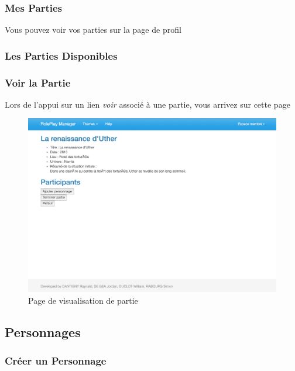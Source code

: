 \documentclass[a4paper,oneside,10pt]{article}
\begin{document}
\subsubsection{Mes Parties}
\label{MUMesParties}

Vous pouvez voir vos parties sur la page de profil

\subsubsection{Les Parties Disponibles}
\label{MULesPartiesDisponibles}

\subsubsection{Voir la Partie}
\label{MUVoirLaPartie}

Lors de l'appui sur un lien \textit{voir} associé à une partie, vous arrivez sur cette page

\begin{figure}[H]
	\begin{center}
		\includegraphics[width=\textwidth]{images/manuel/voirpartie.png}  
		\caption{Page de visualisation de partie}
	\end{center}
\end{figure}

\subsection{Personnages}

\subsubsection{Créer un Personnage}
\label{MUCreerPersonnage}
\end{document}
